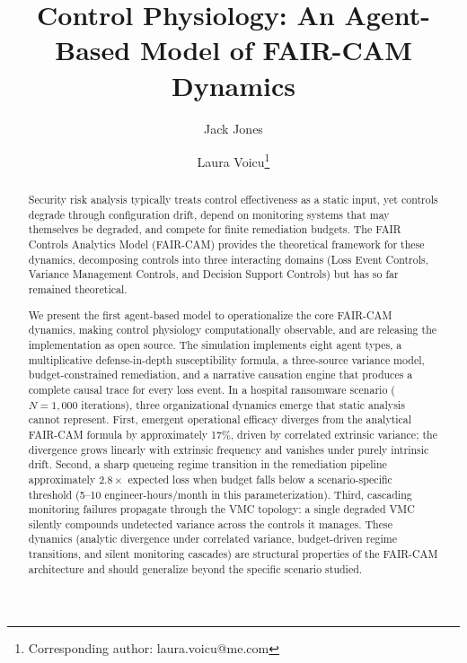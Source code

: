 \documentclass[11pt,a4paper]{article}
\begin{document}
\title{Control Physiology: An Agent-Based Model of FAIR-CAM Dynamics}

\author[1]{Jack Jones}
\author[2]{Laura Voicu\thanks{Corresponding author: laura.voicu@me.com}}

\date{}

\maketitle

\begin{abstract}
Security risk analysis typically treats control effectiveness as a static input, yet controls degrade through configuration drift, depend on monitoring systems that may themselves be degraded, and compete for finite remediation budgets. The FAIR Controls Analytics Model (FAIR-CAM) provides the theoretical framework for these dynamics, decomposing controls into three interacting domains (Loss Event Controls, Variance Management Controls, and Decision Support Controls) but has so far remained theoretical.

We present the first agent-based model to operationalize the core FAIR-CAM dynamics, making control physiology computationally observable, and are releasing the implementation as open source. The simulation implements eight agent types, a multiplicative defense-in-depth susceptibility formula, a three-source variance model, budget-constrained remediation, and a narrative causation engine that produces a complete causal trace for every loss event. In a hospital ransomware scenario ($N=1{,}000$ iterations), three organizational dynamics emerge that static analysis cannot represent. First, emergent operational efficacy diverges from the analytical FAIR-CAM formula by approximately 17\%, driven by correlated extrinsic variance; the divergence grows linearly with extrinsic frequency and vanishes under purely intrinsic drift. Second, a sharp queueing regime transition in the remediation pipeline approximately $2.8\times$ expected loss when budget falls below a scenario-specific threshold (5--10 engineer-hours/month in this parameterization). Third, cascading monitoring failures propagate through the VMC topology: a single degraded VMC silently compounds undetected variance across the controls it manages. These dynamics (analytic divergence under correlated variance, budget-driven regime transitions, and silent monitoring cascades) are structural properties of the FAIR-CAM architecture and should generalize beyond the specific scenario studied.
\end{abstract}
\end{document}
